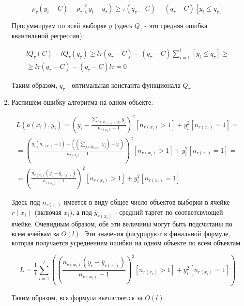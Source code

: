 \documentclass{article}
\begin{document}
\begin{enumerate}
    \begin{equation*}
        {\rho}_{\tau}(y_i - C) - {\rho}_{\tau}(y_i - q_{\tau}) \ge
        \tau(q_{\tau} - C) - (q_{\tau} - C)\left[ y_i \le q_{\tau} \right]
    \end{equation*}
    \normalsize

    Просуммируем по всей выборке $ y $ (здесь $ Q_{\tau} $ - это средняя ошибка квантильной регрессии):

    \small
    \begin{gather*}
        l Q_{\tau} (C) - l Q_{\tau} (q_{\tau}) \ge
        l \tau(q_{\tau} - C) - (q_{\tau} - C) \sum_{i=1}^{l} \left[ y_i \le q_{\tau} \right] \ge \\
        \ge l \tau(q_{\tau} - C) - (q_{\tau} - C) l \tau = 0
    \end{gather*}
    \normalsize

    Таким образом, $ q_{\tau} $ - оптимальная константа функционала $ Q_{\tau} $

    \item Распишем ошибку алгоритма на одном объекте:

    \small
    \begin{gather*}
        L(a(x_i), y_i) = {\left(y_i - \frac{\sum_{j \in B_{r(x_i)} \backslash \{ i \}} y_j}{n_{r(x_i)} - 1} \right)}^2
        \left[ n_{r(x_i)} > 1 \right] + y_i^2 \left[ n_{r(x_i)} = 1 \right] = \\
        = {\left( \frac{y_i (n_{r(x_i)} - 1) - ((\sum_{j \in B_{r(x_i)}} y_j) - y_i )}{n_{r(x_i)} - 1} \right)}^2
        \left[ n_{r(x_i)} > 1 \right] + y_i^2 \left[ n_{r(x_i)} = 1 \right] = \\
        = {\left( \frac{n_{r(x_i)} \left( y_i - \overline{y}_{r(x_i)} \right) }{n_{r(x_i)} - 1}\right)}^2
        \left[ n_{r(x_i)} > 1 \right] + y_i^2 \left[ n_{r(x_i)} = 1 \right]
    \end{gather*}{}
    \normalsize

    Здесь под $ n_{r(x_i)} $ имеется в виду общее число объектов выборки в ячейке $ r(x_i) $ (включая $ x_i $),
    а под $ \overline{y}_{r(x_i)} $ - средний таргет по соответсвующей ячейке. Очевидным образом, обе эти величины
    могут быть подсчитаны по всем ячейкам за $ O(l) $. Эти значения фигурируют в финальной формуле, которая получается
    усреднением ошибки на одном объекте по всем объектам%

    \small
    \begin{equation*}
        L = \frac{1}{l} \sum_{i=1}^{l} \left(
        {\left( \frac{n_{r(x_i)} \left( y_i - \overline{y}_{r(x_i)} \right) }{n_{r(x_i)} - 1}\right)}^2
        \left[ n_{r(x_i)} > 1 \right] + y_i^2 \left[ n_{r(x_i)} = 1 \right] \right)
    \end{equation*}
    \normalsize

    Таким образом, вся формула вычисляется за $ O(l) $.
\end{enumerate}
\end{document}
